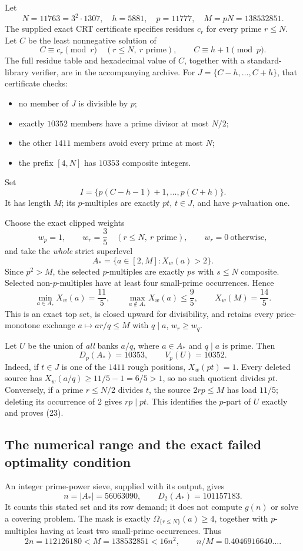 \documentclass[11pt,a4paper]{article}
\begin{document}
Let
\[
 N=11763=3^2\cdot1307,\quad h=5881,\quad p=11777,\quad
 M=pN=138532851.
 \tag{17}
\]
The supplied exact CRT certificate specifies residues \(c_r\) for
every prime \(r\le N\). Let \(C\) be the least nonnegative solution
of
\[
 C\equiv c_r\pmod r\quad(r\le N,\ r\text{ prime}),\qquad
 C\equiv h+1\pmod p.
 \tag{18}
\]
The full residue table and hexadecimal value of \(C\), together
with a standard-library verifier, are in the accompanying archive.
For \(J=\{C-h,\ldots,C+h\}\), that certificate checks:
\begin{itemize}
\item no member of \(J\) is divisible by \(p\);
\item exactly \(10352\) members have a prime divisor at most \(N/2\);
\item the other \(1411\) members avoid every prime at most \(N\);
\item the prefix \([4,N]\) has \(10353\) composite integers.
\end{itemize}
Set
\[
 I=\{p(C-h-1)+1,\ldots,p(C+h)\}.
 \tag{19}
\]
It has length \(M\); its \(p\)-multiples are exactly \(pt\),
\(t\in J\), and have \(p\)-valuation one.

Choose the exact clipped weights
\[
 w_p=1,\qquad w_r=\frac35\quad(r\le N,\ r\text{ prime}),
 \qquad w_r=0\ \text{otherwise},
 \tag{20}
\]
and take the \emph{whole} strict superlevel
\[
 A_*=\{a\in[2,M]:X_w(a)>2\}.
 \tag{21}
\]
Since \(p^2>M\), the selected \(p\)-multiples are exactly \(ps\)
with \(s\le N\) composite. Selected non-\(p\)-multiples have
at least four small-prime occurrences. Hence
\[
 \min_{a\in A_*}X_w(a)=\frac{11}{5},\qquad
 \max_{a\notin A_*}X_w(a)\le\frac95,\qquad
 X_w(M)=\frac{14}{5}.
 \tag{22}
\]
This is an exact top set, is closed upward for divisibility, and
retains every price-monotone exchange
\(a\mapsto ar/q\le M\) with \(q\mid a\), \(w_r\ge w_q\).

Let \(U\) be the union of \emph{all} banks \(a/q\), where
\(a\in A_*\) and \(q\mid a\) is prime. Then
\[
 \boxed{\quad D_p(A_*)=10353,\qquad V_p(U)=10352.\quad}
 \tag{23}
\]
Indeed, if \(t\in J\) is one of the \(1411\) rough positions,
\(X_w(pt)=1\). Every deleted source has
\(X_w(a/q)\ge11/5-1=6/5>1\), so no such quotient divides \(pt\).
Conversely, if a prime \(r\le N/2\) divides \(t\), the source
\(2rp\le M\) has load \(11/5\); deleting its occurrence of \(2\)
gives \(rp\mid pt\). This identifies the \(p\)-part of \(U\)
exactly and proves (23).

\subsection*{The numerical range and the exact failed optimality condition}
An integer prime-power sieve, supplied with its output, gives
\[
 n=|A_*|=56063090,\qquad D_2(A_*)=101157183.
 \tag{24}
\]
It counts this stated set and its row demand; it does not compute
\(g(n)\) or solve a covering problem. The mask is exactly
\(\Omega_{\{r\le N\}}(a)\ge4\), together with \(p\)-multiples
having at least two small-prime occurrences. Thus
\[
 2n=112126180<M=138532851<16n^2,\qquad n/M=0.4046916640\ldots.
 \tag{25}
\]
\end{document}
